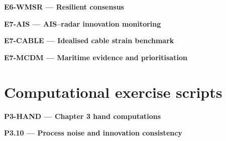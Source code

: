 \par\medskip{}\label{code:E6-WMSR}
\noindent\textbf{E6-WMSR --- Resilient consensus}\par
\noindent{}\par

\par\medskip{}\label{code:E7-AIS}
\noindent\textbf{E7-AIS --- AIS--radar innovation monitoring}\par
\noindent{}\par

\par\medskip{}\label{code:E7-CABLE}
\noindent\textbf{E7-CABLE --- Idealised cable strain benchmark}\par
\noindent{}\par

\par\medskip{}\label{code:E7-MCDM}
\noindent\textbf{E7-MCDM --- Maritime evidence and prioritisation}\par
\noindent{}\par

\section*{Computational exercise scripts}

\par\medskip{}\label{code:P3-HAND}
\noindent\textbf{P3-HAND --- Chapter 3 hand computations}\par
\noindent{}\par

\par\medskip{}\label{code:P3.10}
\noindent\textbf{P3.10 --- Process noise and innovation consistency}\par
\noindent{}\par

